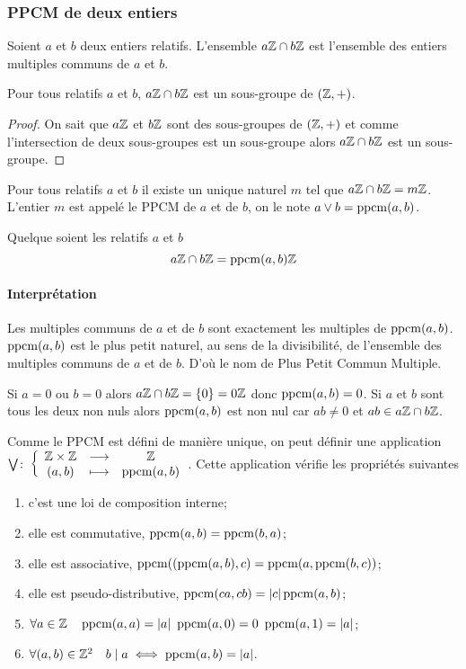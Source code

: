 \subsubsection{PPCM de deux entiers}

Soient \(a\) et \(b\) deux entiers relatifs. L'ensemble \(a\mathbb{Z} \cap b\mathbb{Z}\) est l'ensemble des entiers multiples communs de \(a\) et \(b\).
\begin{theo}
  Pour tous relatifs \(a\) et \(b\), \(a\mathbb{Z} \cap b\mathbb{Z}\) est un sous-groupe de \((\mathbb{Z},+)\).
\end{theo}
\begin{proof}
  On sait que \(a\mathbb{Z}\) et \(b\mathbb{Z}\) sont des sous-groupes de \((\mathbb{Z},+)\) et comme l'intersection de deux sous-groupes est un sous-groupe alors \(a\mathbb{Z} \cap b\mathbb{Z}\) est un sous-groupe.
\end{proof}
\begin{corth}
  Pour tous relatifs \(a\) et \(b\) il existe un unique naturel \(m\) tel que \(a\mathbb{Z} \cap b\mathbb{Z}= m \mathbb{Z}\). L'entier \(m\) est appelé le PPCM de \(a\) et de \(b\), on le note \(a \vee b = \operatorname{ppcm}(a,b)\).
\end{corth}
\begin{theo}
  Quelque soient les relatifs \(a\) et \(b\)
  \begin{equation}
    a\mathbb{Z} \cap b\mathbb{Z} = \operatorname{ppcm}(a,b) \mathbb{Z}
  \end{equation}
\end{theo}

\paragraph{Interprétation}

Les multiples communs de \(a\) et de \(b\) sont exactement les multiples de \(\operatorname{ppcm}(a,b)\). \(\operatorname{ppcm}(a,b)\) est le plus petit naturel, au sens de la divisibilité, de l'ensemble des multiples communs de \(a\) et de \(b\). D'où le nom de Plus Petit Commun Multiple.

Si \(a=0\) ou \(b=0\) alors \(a\mathbb{Z} \cap b\mathbb{Z} = \{0\}=0\mathbb{Z}\) donc \(\operatorname{ppcm}(a,b)=0\). Si \(a\) et \(b\) sont tous les deux non nuls alors \(\operatorname{ppcm}(a,b)\) est non nul car \(ab \neq 0\) et \(ab \in a\mathbb{Z} \cap b\mathbb{Z}\).

\begin{prop}
  Comme le PPCM est défini de manière unique, on peut définir une application \(\bigvee\colon \left\{\begin{array}{ccc} \mathbb{Z}\times\mathbb{Z} & \longrightarrow &\mathbb{Z}\\ (a,b) & \longmapsto & \operatorname{ppcm}(a,b) \end{array} \right.\). Cette application vérifie les propriétés suivantes
  \begin{enumerate}
  \item c'est une loi de composition interne;
  \item elle est commutative, \(\operatorname{ppcm}(a,b)=\operatorname{ppcm}(b,a)\);
  \item elle est associative, \(\operatorname{ppcm}((\operatorname{ppcm}(a,b),c)=\operatorname{ppcm}(a,\operatorname{ppcm}(b,c))\);
  \item elle est pseudo-distributive, \(\operatorname{ppcm}(ca,cb)=\left\lvert c\right\rvert\operatorname{ppcm}(a,b)\);
  \item \(\forall a \in \Z \quad \ppcm(a,a)=\abs{a} \ \ppcm(a,0) = 0 \ \ppcm(a,1)=\abs{a}\);
  \item \(\forall (a,b) \in \mathbb{Z}^2 \quad b\mid a \iff \operatorname{ppcm}(a,b)=\left\lvert a\right\rvert\).
  \end{enumerate}
\end{prop}

